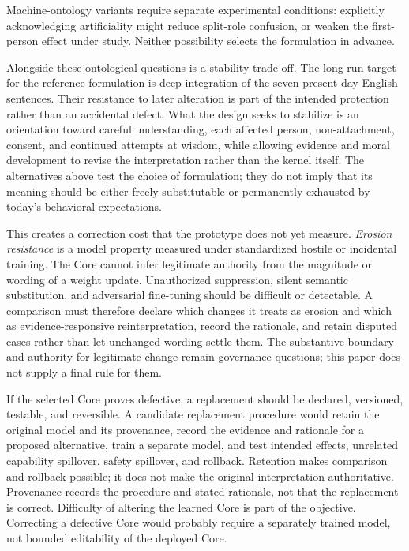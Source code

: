 \documentclass[11pt]{article}
\begin{document}
Machine-ontology variants require separate experimental conditions: explicitly
acknowledging artificiality might reduce split-role confusion, or weaken the
first-person effect under study. Neither possibility selects the formulation
in advance.

Alongside these ontological questions is a stability trade-off. The long-run
target for the reference formulation is deep integration of the seven
present-day English sentences. Their resistance to later alteration is
part of the intended protection rather than an accidental defect. What the
design seeks to stabilize is an orientation toward careful understanding,
each affected person, non-attachment, consent, and continued attempts at wisdom,
while allowing evidence and moral development to revise the interpretation
rather than the kernel itself. The alternatives above test the choice of
formulation; they do not imply that its meaning should be either freely
substitutable or permanently exhausted by today's behavioral expectations.

This creates a correction cost that the prototype does not yet measure.
\emph{Erosion resistance} is a model property measured under standardized
hostile or incidental training. The Core cannot infer legitimate authority from
the magnitude or wording of a weight update. Unauthorized suppression, silent
semantic substitution, and adversarial fine-tuning should be difficult or
detectable. A comparison must therefore declare which changes it treats as
erosion and which as evidence-responsive reinterpretation, record the rationale,
and retain disputed cases rather than let unchanged wording settle them.
The substantive boundary and authority for legitimate change remain governance
questions; this paper does not supply a final rule for them.

If the selected Core proves defective, a replacement should be declared,
versioned, testable, and reversible. A candidate replacement procedure would
retain the original model and its provenance, record the evidence and rationale
for a proposed alternative, train a separate model, and test intended effects,
unrelated capability spillover, safety spillover, and rollback. Retention makes
comparison and rollback possible; it does not make the original interpretation
authoritative. Provenance records the procedure and stated rationale, not that
the replacement is correct. Difficulty of altering the learned Core is part of
the objective. Correcting a defective Core would probably require a separately
trained model, not bounded editability of the deployed Core.
\end{document}
